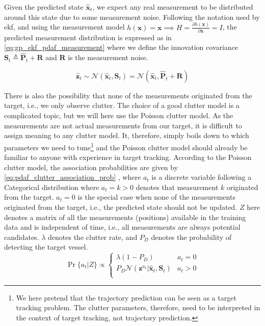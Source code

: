 Given the predicted state $\hat{\boldsymbol{x}}_t$, we expect any real measurement to be distributed around this state due to some measurement noise. Following the notation used by \acrshort{ekf}, and using the measurement model $h(\boldsymbol{x}) = \boldsymbol{x} \implies H = \frac{\partial h (\boldsymbol{x})}{\partial \boldsymbol{x}} = I$, the predicted measurement distribution is expressed as in \cref{eq:gp_ekf_pdaf_measurement} where we define the innovation covariance $\boldsymbol{S}_t \triangleq \hat{\boldsymbol{P}}_t + \boldsymbol{R}$ and $\boldsymbol{R}$ is the measurement noise.

\begin{equation} \label{eq:gp_ekf_pdaf_measurement}
    \hat{\boldsymbol{z}}_t \sim \mathcal{N}(\hat{\boldsymbol{x}}_t, \boldsymbol{S}_{t}) = \mathcal{N}(\hat{\boldsymbol{x}}_t, \hat{\boldsymbol{P}}_t + \boldsymbol{R})
\end{equation}

There is also the possibility that none of the measurements originated from the target, i.e., we only observe clutter. The choice of a good clutter model is a complicated topic, but we will here use the Poisson clutter model. As the measurements are not actual measurements from our target, it is difficult to assign meaning to any clutter model. It, therefore, simply boils down to which parameters we need to tune\footnote{We here pretend that the trajectory prediction can be seen as a target tracking problem. The clutter parameters, therefore, need to be interpreted in the context of target tracking, not trajectory prediction.} and the Poisson clutter model should already be familiar to anyone with experience in target tracking.
According to the Poisson clutter model, the association probabilities are given by \cref{eq:pdaf_clutter_association_prob} \cite{sensorfusjon}, where $a_t$ is a discrete variable following a Categorical distribution where $a_t=k > 0$ denotes that measurement $k$ originated from the target. $a_t = 0$ is the special case when none of the measurements originated from the target, i.e., the predicted state should not be updated. $Z$ here denotes a matrix of all the measurements (positions) available in the training data and is independent of time, i.e., all measurements are always potential candidates. $\lambda$ denotes the clutter rate, and $P_D$ denotes the probability of detecting the target vessel.
\begin{equation}\label{eq:pdaf_clutter_association_prob}
    \Pr\{a_t | Z\} \propto \begin{cases}
        \lambda (1 - P_D)                                                                 & a_t = 0 \\
        P_D \mathcal{N} (\boldsymbol{z}^{a_t} | \hat{\boldsymbol{x}}_t, \boldsymbol{S}_t) & a_t > 0 \\
    \end{cases}
\end{equation}

